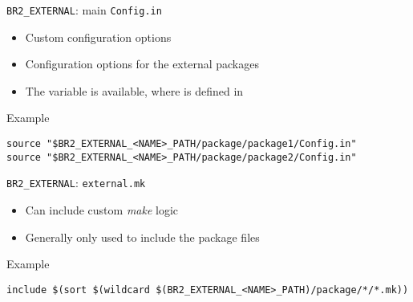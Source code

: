 \begin{frame}[fragile]{{\tt BR2\_EXTERNAL}: main {\tt Config.in}}

  \begin{itemize}
  \item Custom configuration options
  \item Configuration options for the external packages
  \item The
     variable is available, where
     is defined in 
  \end{itemize}

  \begin{block}{Example }
\begin{verbatim}
source "$BR2_EXTERNAL_<NAME>_PATH/package/package1/Config.in"
source "$BR2_EXTERNAL_<NAME>_PATH/package/package2/Config.in"
\end{verbatim}
  \end{block}

\end{frame}

\begin{frame}[fragile]{{\tt BR2\_EXTERNAL}: {\tt external.mk}}

  \begin{itemize}
  \item Can include custom {\em make} logic
  \item Generally only used to include the package  files
  \end{itemize}

  \begin{block}{Example }
\begin{verbatim}
include $(sort $(wildcard $(BR2_EXTERNAL_<NAME>_PATH)/package/*/*.mk))
\end{verbatim}
  \end{block}
\end{frame}

